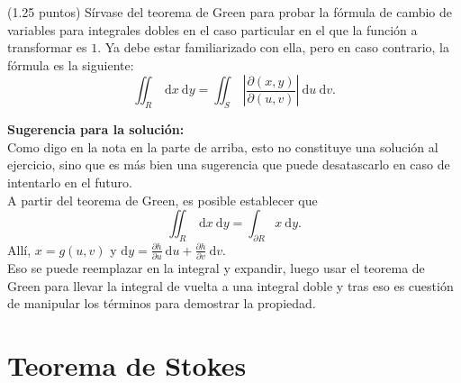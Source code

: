 \documentclass{fmbvecto}
\begin{document}
\phantom{}

\begin{problema}
    
    (1.25 puntos) Sírvase del teorema de Green para probar la fórmula de cambio de variables para integrales dobles en el caso particular en el que la función a transformar es \(1\). Ya debe estar familiarizado con ella, pero en caso contrario, la fórmula es la siguiente: 
    \[
    \iint_R \: \mathrm{d}x \: \mathrm{d}y = \iint_S \: \left| \frac{\partial(x, y)}{\partial(u, v)} \right| \: \mathrm{d}u \: \mathrm{d}v.
    \]

\tcblower
\textbf{Sugerencia para la solución:}\\

    Como digo en la nota en la parte de arriba, esto no constituye una solución al ejercicio, sino que es más bien una sugerencia que puede desatascarlo en caso de intentarlo en el futuro. \\
    
    A partir del teorema de Green, es posible establecer que 
    \[
    \iint_R \: \mathrm{d}x \: \mathrm{d}y = \int_{\partial R} x \: \mathrm{d}y.
    \]
    Allí, \(x = g(u, v)\) y \(\mathrm{d}y = \frac{\partial h}{\partial u} \: \mathrm{d}u + \frac{\partial h}{\partial v} \: \mathrm{d}v\). \\
    
    Eso se puede reemplazar en la integral y expandir, luego usar el teorema de Green para llevar la integral de vuelta a una integral doble y tras eso es cuestión de manipular los términos para demostrar la propiedad.
\end{problema}

\section{Teorema de Stokes}
\end{document}

